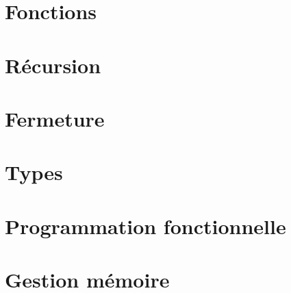 \documentclass{scrreprt}
\begin{document}


\chapter{Fonctions}





\chapter{Récursion}


\chapter{Fermeture}




\chapter{Types}



\chapter{Programmation fonctionnelle}















\chapter{Gestion mémoire}




\end{document}
